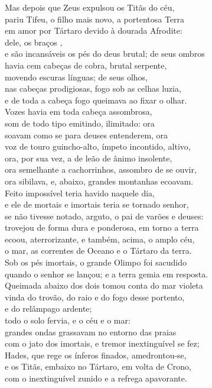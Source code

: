 \begin{pages}
\begin{Rightside}
Mas depois que Zeus expulsou os Titãs do céu, \\
pariu Tifeu, o filho mais novo, a portentosa Terra\\
em amor por Tártaro devido à dourada Afrodite:\\
dele, os braços \dagger{}\dagger{},\\
e são incansáveis os pés do deus brutal; de seus ombros\\
havia cem cabeças de cobra, brutal serpente, \\
movendo escuras línguas; de seus olhos,\\
nas cabeças prodigiosas, fogo sob as celhas luzia,\\
e de toda a cabeça fogo queimava ao fixar o olhar.\\
Vozes havia em toda cabeça assombrosa,\\
som de todo tipo emitindo, ilimitado: ora \\
soavam como se para deuses entenderem, ora\\
voz de touro guincho-alto, ímpeto incontido, altivo,\\
ora, por sua vez, a de leão de ânimo insolente,\\
ora semelhante a cachorrinhos, assombro de se ouvir,\\
ora sibilava, e, abaixo, grandes montanhas ecoavam. \\
Feito impossível teria havido naquele dia,\\
e ele de mortais e imortais teria se tornado senhor,\\
se não tivesse notado, arguto, o pai de varões e deuses:\\
trovejou de forma dura e ponderosa, em torno a terra\\
ecoou, aterrorizante, e também, acima, o amplo céu, \\
o mar, as correntes de Oceano e o Tártaro da terra.\\
Sob os pés imortais, o grande Olimpo foi sacudido\\
quando o senhor se lançou; e a terra gemia em resposta.\\
Queimada abaixo dos dois tomou conta do mar violeta\\
vinda do trovão, do raio e do fogo desse portento, \\
 e do relâmpago ardente;\\
todo o solo fervia, e o céu e o mar:\\
grandes ondas grassavam no entorno das praias\\
com o jato dos imortais, e tremor inextinguível se fez;\\
Hades, que rege os ínferos finados, amedrontou-se, \\
e os Titãs, embaixo no Tártaro, em volta de Crono,\\
com o inextinguível zunido e a refrega apavorante.\\


\end{Rightside}
\end{pages}

